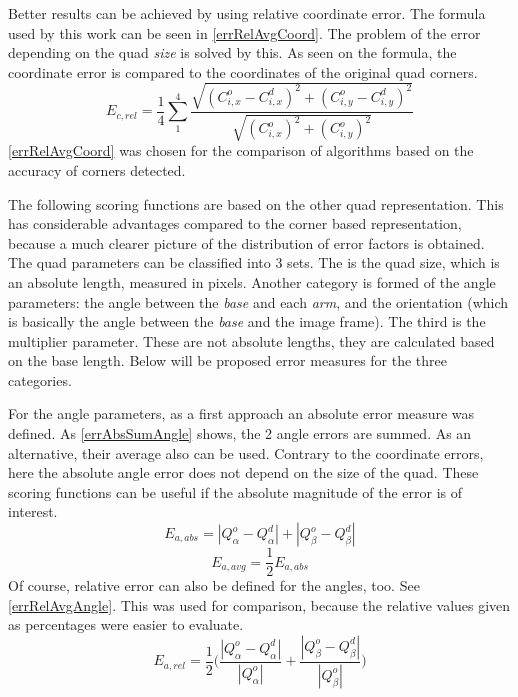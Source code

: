 Better results can be achieved by using relative coordinate error.
The formula used by this work can be seen in \eqref{errRelAvgCoord}.
The problem of the error depending on the quad \textit{size} is solved by this.
As seen on the formula, the coordinate error is compared to the coordinates of the original quad corners.
\begin{equation}
	E_{c,rel} = \frac{1}{4}\sum_{1}^{4} \frac{\sqrt{(C_{i,x}^o - C_{i,x}^d)^2 + (C_{i,y}^o - C_{i,y}^d)^2}}{\sqrt{(C_{i,x}^o)^2 + (C_{i,y}^o)^2}}
	\label{eq:errRelAvgCoord}
\end{equation}
\eqref{errRelAvgCoord} was chosen for the comparison of algorithms based on the accuracy of corners detected.

The following scoring functions are based on the other quad representation.
This has considerable advantages compared to the corner based representation, because a much clearer picture of the distribution of error factors is obtained.
The quad parameters can be classified into 3 sets.
The is the quad size, which is an absolute length, measured in pixels.
Another category is formed of the angle parameters: the angle between the \textit{base} and each \textit{arm}, and the orientation (which is basically the angle between the \textit{base} and the image frame).
The third is the multiplier parameter.
These are not absolute lengths, they are calculated based on the base length.
Below will be proposed error measures for the three categories.

For the angle parameters, as a first approach an absolute error measure was defined.
As \eqref{errAbsSumAngle} shows, the 2 angle errors are summed.
As an alternative, their average also can be used.
Contrary to the coordinate errors, here the absolute angle error does not depend on the size of the quad.
These scoring functions can be useful if the absolute magnitude of the error is of interest.
\begin{equation}
	E_{a,abs} = |Q_\alpha^o - Q_\alpha^d| + |Q_\beta^o - Q_\beta^d|
	\label{eq:errAbsSumAngle}
\end{equation}
\begin{equation}
	E_{a,avg} = \frac{1}{2} E_{a,abs}
	\label{eq:errAbsAvgAngle}
\end{equation}
Of course, relative error can also be defined for the angles, too.
See \eqref{errRelAvgAngle}.
This was used for comparison, because the relative values given as percentages were easier to evaluate.
\begin{equation}
	E_{a,rel} = \frac{1}{2}\Bigg(\frac{|Q_\alpha^o - Q_\alpha^d|}{|Q_\alpha^o|} + \frac{|Q_\beta^o - Q_\beta^d|}{|Q_\beta^o|}\Bigg)
	\label{eq:errRelAvgAngle}
\end{equation}

